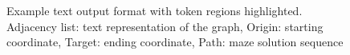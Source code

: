 \begin{figure} 
	\centering
	\begin{minipage}{5in}
	  \footnotesize
	  
	\end{minipage}
	\caption{
	  Example text output format with token regions highlighted.
	  \colorbox[RGB]{ 217,210,233 }{Adjacency list}: text representation of the graph,
	  \colorbox[RGB]{ 217,234,211 }{Origin}: starting coordinate,
	  \colorbox[RGB]{ 234,209,220 }{Target}: ending coordinate,
	  \colorbox[RGB]{ 207,226,243 }{Path}: maze solution sequence
	}
	\label{fig:token-regions}
\end{figure}